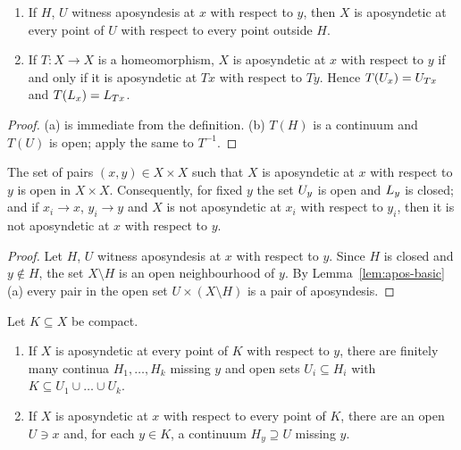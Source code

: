 \begin{lemma}\label{lem:apos-basic}
\leavevmode
\begin{enumerate}[label=(\alph*)]
\item If $H$, $U$ witness aposyndesis at $x$ with respect to $y$, then $X$ is aposyndetic at every point of
$U$ with respect to every point outside $H$.
\item If $T\colon X\to X$ is a homeomorphism, $X$ is aposyndetic at $x$ with respect to $y$ if and only if
it is aposyndetic at $Tx$ with respect to $Ty$. Hence $T(U_{x})=U_{Tx}$ and $T(L_{x})=L_{Tx}$.
\end{enumerate}
\end{lemma}

\begin{proof}
(a) is immediate from the definition. (b) $T(H)$ is a continuum and $T(U)$ is open; apply the same to
$T^{-1}$.
\end{proof}


\begin{theorem}\label{thm:jones48-1}
The set of pairs $(x,y)\in X\times X$ such that $X$ is aposyndetic at $x$ with respect to $y$ is open in
$X\times X$. Consequently, for fixed $y$ the set $U_{y}$ is open and $L_{y}$ is closed; and if
$x_i\to x$, $y_i\to y$ and $X$ is not aposyndetic at $x_i$ with respect to $y_i$, then it is not
aposyndetic at $x$ with respect to $y$.
\end{theorem}

\begin{proof}
Let $H$, $U$ witness aposyndesis at $x$ with respect to $y$. Since $H$ is closed and $y\notin H$, the set
$X\setminus H$ is an open neighbourhood of $y$. By Lemma~\ref{lem:apos-basic}(a) every pair in the open set
$U\times(X\setminus H)$ is a pair of aposyndesis.
\end{proof}


\begin{lemma}\label{lem:heine-borel}
Let $K\subseteq X$ be compact.
\begin{enumerate}[label=(\alph*)]
\item If $X$ is aposyndetic at every point of $K$ with respect to $y$, there are finitely many continua
$H_1,\dots,H_k$ missing $y$ and open sets $U_i\subseteq H_i$ with $K\subseteq U_1\cup\dots\cup U_k$.
\item If $X$ is aposyndetic at $x$ with respect to every point of $K$, there are an open $U\ni x$ and, for
each $y\in K$, a continuum $H_y\supseteq U$ missing $y$.
\end{enumerate}
\end{lemma}

